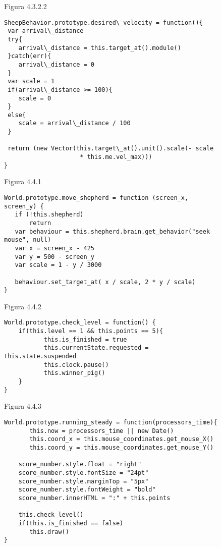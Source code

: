  \begin{figure}[p]
Figura 4.3.2.2
\begin{verbatim}
SheepBehavior.prototype.desired\_velocity = function(){
 var arrival\_distance
 try{
    arrival\_distance = this.target_at().module()
 }catch(err){
    arrival\_distance = 0
 }
 var scale = 1
 if(arrival\_distance >= 100){
    scale = 0
 }
 else{
    scale = arrival\_distance / 100
 }

 return (new Vector(this.target\_at().unit().scale(- scale 
                     * this.me.vel_max)))
}
\end{verbatim}
 \end{figure}


\begin{figure}[p]
Figura 4.4.1
\begin{verbatim}
World.prototype.move_shepherd = function (screen_x, screen_y) {
   if (!this.shepherd)
       return
   var behaviour = this.shepherd.brain.get_behavior("seek mouse", null)
   var x = screen_x - 425
   var y = 500 - screen_y
   var scale = 1 - y / 3000

   behaviour.set_target_at( x / scale, 2 * y / scale)
}
\end{verbatim}


Figura 4.4.2
\begin{verbatim}
World.prototype.check_level = function() {
    if(this.level == 1 && this.points == 5){
           this.is_finished = true
           this.currentState.requested = this.state.suspended
           this.clock.pause()
           this.winner_pig()
    }
}
\end{verbatim}


Figura 4.4.3
\begin{verbatim}
World.prototype.running_steady = function(processors_time){
       this.now = processors_time || new Date()
       this.coord_x = this.mouse_coordinates.get_mouse_X()
       this.coord_y = this.mouse_coordinates.get_mouse_Y()

    score_number.style.float = "right"
    score_number.style.fontSize = "24pt"
    score_number.style.marginTop = "5px"
    score_number.style.fontWeight = "bold"
    score_number.innerHTML = ":" + this.points

    this.check_level()
    if(this.is_finished == false)
       this.draw()
}
\end{verbatim}
\end{figure}


